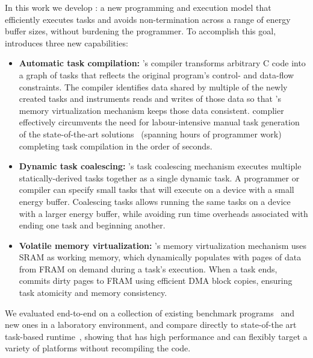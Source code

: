 In this work we develop {\bf \sys}: a new programming and execution model that efficiently executes tasks and avoids non-termination across a range of energy buffer sizes, without burdening the programmer. To accomplish this goal, \sys introduces three new capabilities: 

\begin{itemize}
	\item {\bf Automatic task compilation:} \sys's compiler transforms arbitrary C code into a graph of tasks that reflects the original program's control- and data-flow constraints. The compiler identifies data shared by multiple of the newly created tasks and instruments reads and writes of those data so that \sys's memory virtualization mechanism keeps those data consistent. \sys complier effectively circumvents the need for labour-intensive manual task generation of the state-of-the-art solutions~\cite{chain,alpaca} (spanning hours of programmer work) completing task compilation in the order of seconds.
	\item {\bf Dynamic task coalescing:} \sys's task coalescing mechanism executes multiple statically-derived tasks together as a single dynamic task. A programmer or compiler can specify small tasks that will execute on a device with a small energy buffer. Coalescing tasks allows running the same tasks on a device with a larger energy buffer, while avoiding run time overheads associated with ending one task and beginning another.
	\item {\bf Volatile memory virtualization:} \sys's memory virtualization mechanism uses SRAM as working memory, which \sys dynamically populates with pages of data from FRAM on demand during a task's execution. When a task ends, \sys commits dirty pages to FRAM using efficient DMA block copies, ensuring task atomicity and memory consistency. 
\end{itemize}

We evaluated \sys end-to-end on a collection of existing benchmark programs~\cite[Sec. 5]{chain} and new ones in a laboratory environment, and compare directly to state-of-the art task-based runtime~\cite{chain}, showing that \sys has high performance and can flexibly target a variety of platforms without recompiling the code. 

